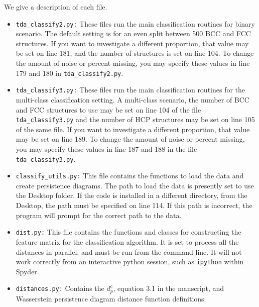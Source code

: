 \documentclass[10pt]{amsart}
\begin{document}
We give a description of each file.
\begin{itemize}
	\item \texttt{tda\_classify2.py:} 
		These files run the main classification routines for binary scenario. 
		The default setting is for 
		an even split between 500 BCC and FCC structures.
		If you want to investigate a different proportion, that value
		may be set on line 181, and the number of structures is set on line 104.
		To change the amount of noise or percent missing, you may specify
		these values in line 179 and 180 in \texttt{tda\_classify2.py}.
		
	\item \texttt{tda\_classify3.py:}
		These files run the main classification routines for the
		multi-class classification setting. A multi-class scenario, the number of BCC and FCC structures
		to use may be set on line 104 of the file \texttt{tda\_classify3.py} and 
		the number of HCP structures may be set on line 105 of the same
		file. If you want to investigate a different proportion, that value
		may be set on line 189.
		To change the amount of noise or percent missing, you may specify
		these values in line 187 and 188 in the file \texttt{tda\_classify3.py}.
		
	\item \texttt{classify\_utils.py:}
		This file contains the functions to load the data and create 
		persistence diagrams. The path to load the data is presently set to use 
			the Desktop folder. If the code is installed in a different directory,
			from the Desktop, the path must be specified on line 114. If this path
			is incorrect, the program will prompt for the correct path to the data.
			
		\item \texttt{dist.py:}
			This file contains the functions and classes 
			for constructing the feature matrix for the classification 
			algorithm. It is set to process all the distances in parallel, and 
			must be run from the command line. It will not work correctly from an 
			interactive python session, such as \texttt{ipython} within Spyder.
			
		\item \texttt{distances.py:}
			Contains the $d_p^c$, equation 3.1 in the manscript, and Wasserstein persistence diagram 
			distance function definitions.
\end{itemize}
\end{document}
